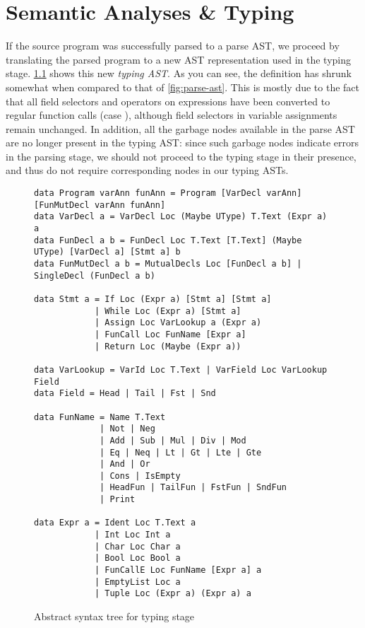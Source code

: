 \chapter{Semantic Analyses \& Typing} \label{chp:semantic-analyses}

If the source program was successfully parsed to a parse AST, we proceed by
translating the parsed program to a new AST representation used in
the typing stage.
\cref{fig:type-ast} shows this new \emph{typing AST}.
As you can see, the definition has shrunk somewhat when compared to that of
\cref{fig:parse-ast}. This is mostly due to the fact that all field selectors
and operators on expressions have been converted to regular function calls (case
), although field selectors in variable assignments remain
unchanged.
In addition, all the garbage nodes available in the parse AST are no longer
present in the typing AST: since such garbage nodes indicate errors in the
parsing stage, we should not proceed to the typing stage in their presence, and
thus do not require corresponding nodes in our typing ASTs.

\begin{figure}
\begin{verbatim}
data Program varAnn funAnn = Program [VarDecl varAnn] [FunMutDecl varAnn funAnn]
data VarDecl a = VarDecl Loc (Maybe UType) T.Text (Expr a) a
data FunDecl a b = FunDecl Loc T.Text [T.Text] (Maybe UType) [VarDecl a] [Stmt a] b
data FunMutDecl a b = MutualDecls Loc [FunDecl a b] | SingleDecl (FunDecl a b)

data Stmt a = If Loc (Expr a) [Stmt a] [Stmt a]
            | While Loc (Expr a) [Stmt a]
            | Assign Loc VarLookup a (Expr a)
            | FunCall Loc FunName [Expr a]
            | Return Loc (Maybe (Expr a))

data VarLookup = VarId Loc T.Text | VarField Loc VarLookup Field
data Field = Head | Tail | Fst | Snd

data FunName = Name T.Text
             | Not | Neg
             | Add | Sub | Mul | Div | Mod
             | Eq | Neq | Lt | Gt | Lte | Gte
             | And | Or
             | Cons | IsEmpty
             | HeadFun | TailFun | FstFun | SndFun
             | Print

data Expr a = Ident Loc T.Text a
            | Int Loc Int a
            | Char Loc Char a
            | Bool Loc Bool a
            | FunCallE Loc FunName [Expr a] a
            | EmptyList Loc a
            | Tuple Loc (Expr a) (Expr a) a
\end{verbatim}

\caption{Abstract syntax tree for typing stage}
\label{fig:type-ast}
\end{figure}

